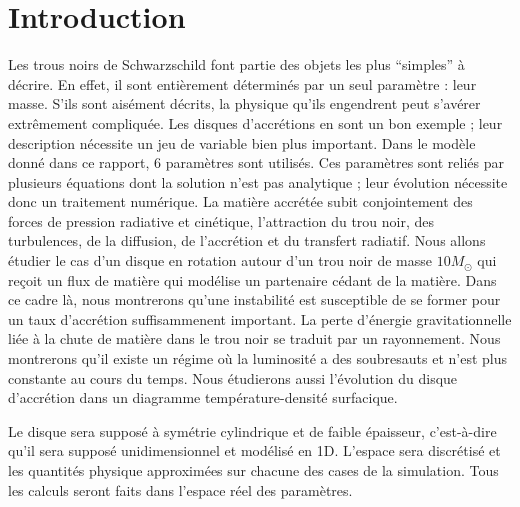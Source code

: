 \section*{Introduction}

Les trous noirs de Schwarzschild font partie des objets les plus ``simples'' à décrire. En effet, il sont entièrement déterminés par un seul paramètre : leur masse. S'ils sont aisément décrits, la physique qu'ils engendrent peut s'avérer extrêmement compliquée. Les disques d'accrétions en sont un bon exemple ; leur description nécessite un jeu de variable bien plus important. Dans le modèle donné dans ce rapport, 6 paramètres sont utilisés. Ces paramètres sont reliés par plusieurs équations dont la solution n'est pas analytique ; leur évolution nécessite donc un traitement numérique. La matière accrétée subit conjointement des forces de pression radiative et cinétique, l'attraction du trou noir, des turbulences, de la diffusion, de l'accrétion et du transfert radiatif. Nous allons étudier le cas d'un disque en rotation autour d'un trou noir de masse $10M_\odot$ qui reçoit un flux de matière qui modélise un partenaire cédant de la matière. Dans ce cadre là, nous montrerons qu'une instabilité est susceptible de se former pour un taux d'accrétion suffisammenent important. La perte d'énergie gravitationnelle liée à la chute de matière dans le trou noir se traduit par un rayonnement. Nous montrerons qu'il existe un régime où la luminosité a des soubresauts et n'est plus constante au cours du temps. Nous étudierons aussi l'évolution du disque d'accrétion dans un diagramme température-densité surfacique.

Le disque sera supposé à symétrie cylindrique et de faible épaisseur, c'est-à-dire qu'il sera supposé unidimensionnel et modélisé en 1D. L'espace sera discrétisé et les quantités physique approximées sur chacune des cases de la simulation. Tous les calculs seront faits dans l'espace réel des paramètres.

